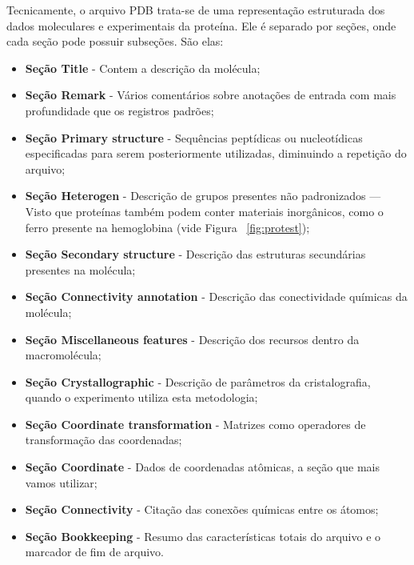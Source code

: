 \documentclass[a4paper,12pt]{article}
\begin{document}
	Tecnicamente, o arquivo PDB trata-se de uma representação estruturada dos dados moleculares e experimentais da proteína. Ele é separado por seções, onde cada seção pode possuir subseções. São elas: 
	\begin{itemize}
		\item \textbf{Seção Title} - Contem a descrição da molécula;
		\vspace{-0.3cm}
		
		\item \textbf{Seção Remark} - Vários comentários sobre anotações de entrada com mais profundidade que os registros padrões;
		\vspace{-0.3cm}
		
		\item \textbf{Seção Primary structure} - Sequências peptídicas ou nucleotídicas especificadas para serem posteriormente utilizadas, diminuindo a repetição do arquivo;
		
		\vspace{-0.3cm}
		\item \textbf{Seção Heterogen} - Descrição de grupos presentes não padronizados --- Visto que proteínas também podem conter materiais inorgânicos, como o ferro presente na hemoglobina (vide Figura ~\ref{fig:protest});
		\vspace{-0.3cm}
		
		\item \textbf{Seção Secondary structure} - Descrição das estruturas secundárias presentes na molécula;
		
		\vspace{-0.3cm}
		\item \textbf{Seção Connectivity annotation} - Descrição das conectividade químicas da molécula;
		\vspace{-0.3cm}
		
		\item \textbf{Seção Miscellaneous features} - Descrição dos recursos dentro da macromolécula;
		\vspace{-0.3cm}
		
		\item \textbf{Seção Crystallographic} - Descrição de parâmetros da cristalografia, quando o experimento utiliza esta metodologia;
		
		\vspace{-0.3cm}
		\item \textbf{Seção Coordinate transformation} - Matrizes como operadores de transformação das coordenadas;
		\vspace{-0.3cm}
		
		\item \textbf{Seção Coordinate} - Dados de coordenadas atômicas, a seção que mais vamos utilizar;
		\vspace{-0.3cm}
		
		\item \textbf{Seção Connectivity} - Citação das conexões químicas entre os átomos;
		\vspace{-0.3cm}
		
		\item \textbf{Seção Bookkeeping} - Resumo das características totais do arquivo e o marcador de fim de arquivo.
	\end{itemize}
	
\end{document}
